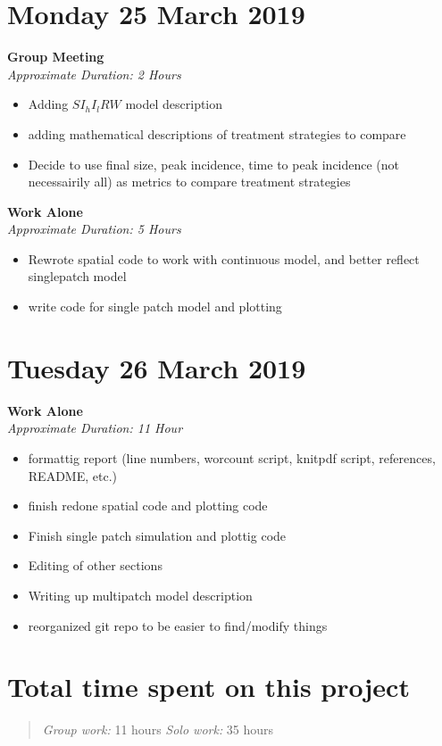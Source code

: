 \documentclass[12pt]{article}\usepackage[]{graphicx}\usepackage[]{color}
\begin{document}
\section*{Monday 25 March 2019}
\textbf{Group Meeting} \\
\emph{Approximate Duration: 2 Hours}
\begin{itemize}
    \item Adding $S I_h I_l R W$ model description
    \item adding mathematical descriptions of treatment strategies to compare
    \item Decide to use final size, peak incidence, time to peak incidence (not necessairily all) as metrics to compare treatment strategies
\end{itemize}
\textbf{Work Alone} \\
\emph{Approximate Duration: 5 Hours}
\begin{itemize}
    \item Rewrote spatial code to work with continuous model, and better reflect singlepatch model
    \item write code for single patch model and plotting
\end{itemize}
\section*{Tuesday 26 March 2019}
\textbf{Work Alone} \\
\emph{Approximate Duration: 11 Hour}
\begin{itemize}
    \item formattig report (line numbers, worcount script, knitpdf script, references, README, etc.)
    \item finish redone spatial code and plotting code
    \item Finish single patch simulation and plottig code
    \item Editing of other sections
    \item Writing up multipatch model description
    \item reorganized git repo to be easier to find/modify things
\end{itemize}
\section*{Total time spent on this project}
\begin{quote}
\emph{Group work:} 11 hours
\emph{Solo work:} 35 hours
\end{quote}
\end{document}
